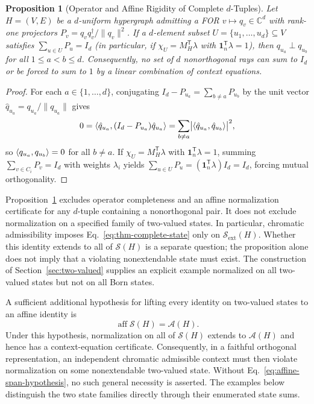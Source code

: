 \documentclass[aps,pra,reprint,superscriptaddress,longbibliography,nofootinbib,floatfix,10pt]{revtex4-2}
\newtheorem{proposition}[theorem]{Proposition}
\theoremstyle{definition}\newtheorem{definition}[theorem]{Definition}
\theoremstyle{remark}\newtheorem{remark}[theorem]{Remark}
\newcommand{\C}{\mathbb C}\newcommand{\R}{\mathbb R}\newcommand{\Q}{\mathbb Q}
\newcommand{\Sc}{\mathcal S}\newcommand{\Cc}{\mathcal C}\newcommand{\Wc}{\mathcal W}
\begin{document}
\begin{proposition}[Operator and Affine Rigidity of Complete $d$-Tuples]\label{prop:no-operator-complete}
Let $H=(V,E)$ be a $d$-uniform hypergraph admitting a FOR $v\mapsto q_v\in\C^d$ with rank-one projectors $P_v=q_vq_v^\dagger/\|q_v\|^2$. If a $d$-element subset $U=\{u_1,\ldots,u_d\}\subseteq V$ satisfies $\sum_{u\in U}P_u=I_d$ (in particular, if $\chi_U=M_H^{\mathsf T}\lambda$ with $\mathbf{1}_n^{\mathsf T}\lambda=1$), then $q_{u_a}\perp q_{u_b}$ for all $1\le a<b\le d$. Consequently, no set of $d$ nonorthogonal rays can sum to $I_d$ or be forced to sum to $1$ by a linear combination of context equations.
\end{proposition}
\begin{proof}
For each $a\in\{1,\ldots,d\}$, conjugating $I_d-P_{u_a}=\sum_{b\neq a}P_{u_b}$ by the unit vector $\hat{q}_{u_a}=q_{u_a}/\|q_{u_a}\|$ gives
\[
0 = \langle \hat{q}_{u_a},(I_d-P_{u_a})\hat{q}_{u_a}\rangle = \sum_{b\neq a}\bigl|\langle \hat{q}_{u_a},\hat{q}_{u_b}\rangle\bigr|^2,
\]
so $\langle q_{u_a},q_{u_b}\rangle=0$ for all $b\neq a$. If $\chi_U=M_H^{\mathsf T}\lambda$ with $\mathbf{1}_n^{\mathsf T}\lambda=1$, summing $\sum_{v\in C_i}P_v=I_d$ with weights $\lambda_i$ yields $\sum_{u\in U}P_u=(\mathbf{1}_n^{\mathsf T}\lambda)I_d=I_d$, forcing mutual orthogonality.
\end{proof}

Proposition~\ref{prop:no-operator-complete} excludes operator completeness and an affine normalization certificate for any $d$-tuple containing a nonorthogonal pair. It does not exclude normalization on a specified family of two-valued states. In particular, chromatic admissibility imposes Eq.~\eqref{eq:thm-complete-state} only on $\Sc_{\mathrm{ext}}(H)$. Whether this identity extends to all of $\Sc(H)$ is a separate question; the proposition alone does not imply that a violating nonextendable state must exist. The construction of Section~\ref{sec:two-valued} supplies an explicit example normalized on all two-valued states but not on all Born states.

A sufficient additional hypothesis for lifting every identity on two-valued states to an affine identity is
\begin{equation}\label{eq:affine-span-hypothesis}
\operatorname{aff}\Sc(H)=\mathcal A(H).
\end{equation}
Under this hypothesis, normalization on all of $\Sc(H)$ extends to $\mathcal A(H)$ and hence has a context-equation certificate. Consequently, in a faithful orthogonal representation, an independent chromatic admissible context must then violate normalization on some nonextendable two-valued state. Without Eq.~\eqref{eq:affine-span-hypothesis}, no such general necessity is asserted. The examples below distinguish the two state families directly through their enumerated state sums.
\end{document}
